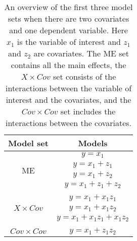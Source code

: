 \begin{table}[]
\caption{}
\caption*{\footnotesize An overview of the first three model sets when there are two covariates and one dependent variable. Here $x_1$ is the variable of interest and $z_1$ and $z_2$ are covariates. The ME set contains all the main effects, the $X \times Cov$ set consists of the interactions between the variable of interest and the covariates, and the $Cov \times Cov$ set includes the interactions between the covariates.}
\label{modelsets1}
\centering
\begin{tabular}{cc}
\toprule
Model set & Models \\ 
\midrule
\multirow{4}{*}{ME} & $y=x_1$ \\ & $y=x_1+z_1$ \\ & $y=x_1+z_2$ \\ & $y=x_1+z_1+z_2$  \\ & \\
\multirow{3}{*}{$X \times Cov$} & $y=x_1+x_1z_1$ \\ & $y=x_1+x_1z_2$ \\ & $y=x_1+x_1z_1+x_1z_2$  \\& \\
$Cov \times Cov$ & $y=x_1+z_1z_2$ \\ 
\bottomrule
\end{tabular}
\end{table}
